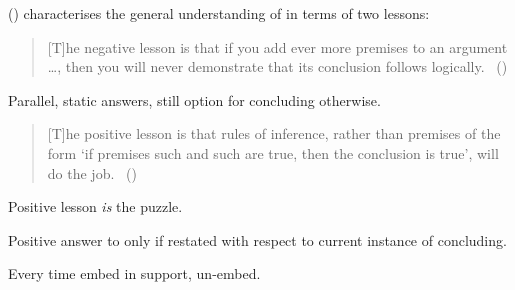 \begin{note}
{    \citeauthor{Wieland:2013vf} (\citeyear{Wieland:2013vf}) characterises the general understanding of \textcite{Carroll:1895uj} in terms of two lessons:
  \begin{quote}
    [T]he negative lesson is that if you add ever more premises to an argument \dots, then you will never demonstrate that its conclusion follows logically.\newline
    \mbox{ }\hfill\mbox{(\citeyear[984]{Wieland:2013vf})}
  \end{quote}

  Parallel, static answers, still option for concluding otherwise.

  \begin{quote}
    [T]he positive lesson is that rules of inference, rather than premises of the form `if premises such and such are true, then the conclusion is true', will do the job.\newline
    \mbox{ }\hfill\mbox{(\citeyear[984]{Wieland:2013vf})}
  \end{quote}
  Positive lesson \emph{is} the puzzle.
  }

  \begin{generator}
    Positive answer to only if \requ{} restated with respect to current instance of concluding.
  \end{generator}

  Every time embed in support, un-embed.
\end{note}





